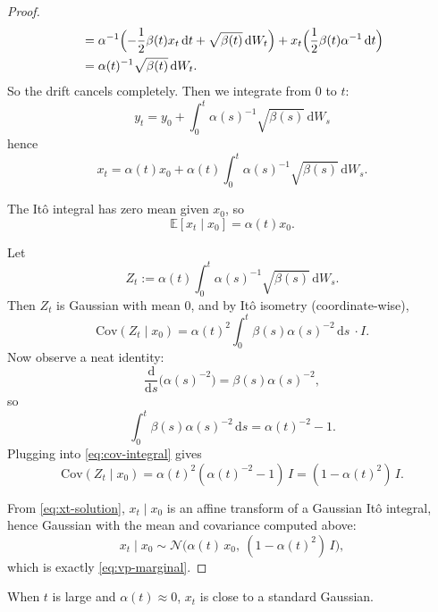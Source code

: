 \documentclass[../main]{subfiles}
\begin{document}
\begin{proof}
\begin{align}
        &= \alpha^{-1}\Bigl(-\frac12\beta(t)x_t\,\mathrm dt + \sqrt{\beta(t)}\,\mathrm dW_t\Bigr)
          + x_t\Bigl(\frac12\beta(t)\alpha^{-1}\,\mathrm dt\Bigr) \\
        &= \alpha(t)^{-1}\sqrt{\beta(t)}\,\mathrm dW_t.
    \end{align}
    So the drift cancels completely. Then we integrate from $0$ to $t$:
    \begin{equation}\label{eq:yt-solution}
        y_t = y_0 + \int_0^t \alpha(s)^{-1}\sqrt{\beta(s)}\,\mathrm dW_s
    \end{equation}
    hence
    \begin{equation}\label{eq:xt-solution}
        x_t = \alpha(t) x_0 + \alpha(t)\int_0^t \alpha(s)^{-1}\sqrt{\beta(s)}\,\mathrm dW_s.
    \end{equation}

    The It\^{o} integral has zero mean given $x_0$, so
    \begin{equation}
        \mathbb E[x_t\mid x_0] = \alpha(t)x_0.
    \end{equation}
    
    Let
    \begin{equation}
        Z_t := \alpha(t)\int_0^t \alpha(s)^{-1}\sqrt{\beta(s)}\,\mathrm dW_s.
    \end{equation}
    Then $Z_t$ is Gaussian with mean $0$, and by It\^{o} isometry (coordinate-wise),
    \begin{equation}\label{eq:cov-integral}
        \mathrm{Cov}(Z_t\mid x_0)
        =
        \alpha(t)^2\int_0^t \beta(s)\alpha(s)^{-2}\,\mathrm ds\ \cdot I.
    \end{equation}
    Now observe a neat identity:
    \begin{equation}
        \frac{\mathrm d}{\mathrm ds}\bigl(\alpha(s)^{-2}\bigr)
        = \beta(s)\alpha(s)^{-2},
    \end{equation}
    so
    \begin{equation}
        \int_0^t \beta(s)\alpha(s)^{-2}\,\mathrm ds
        = \alpha(t)^{-2}-1.
    \end{equation}
    Plugging into \eqref{eq:cov-integral} gives
    \begin{equation}
        \mathrm{Cov}(Z_t\mid x_0)
        = \alpha(t)^2(\alpha(t)^{-2}-1)\,I
        = (1-\alpha(t)^2)\,I.
    \end{equation}
    
    From \eqref{eq:xt-solution}, $x_t\mid x_0$ is an affine transform of a Gaussian It\^{o} integral,
    hence Gaussian with the mean and covariance computed above:
    \begin{equation}
        x_t \mid x_0 \sim \mathcal N\!\bigl(\alpha(t)\,x_0,\ (1-\alpha(t)^2)\,I\bigr),
    \end{equation}
    which is exactly \eqref{eq:vp-marginal}.
\end{proof}
When $t$ is large and $\alpha(t)\approx 0$, $x_t$ is close to a standard Gaussian.
\end{document}
